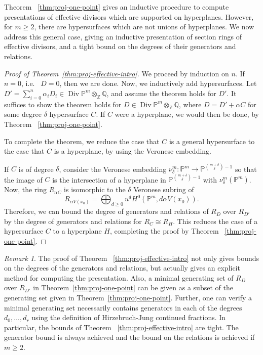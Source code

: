 \documentclass{amsart}
\theoremstyle{plain}
\theoremstyle{definition}
\theoremstyle{remark}
\newtheorem{rem}[thm]{Remark}
\numberwithin{equation}{section}
\newcommand\bq{{\mathbb Q}}
\newcommand\bp{{\mathbb P}}
\newcommand\bz{{\mathbb Z}}
\DeclareMathOperator\di{Div}
\newcommand\pdeg{\delta}
\begin{document}
Theorem ~\ref{thm:proj-one-point} gives an inductive procedure to
compute presentations of effective divisors which are supported on
hyperplanes. However, for $m \geq 2$, there are hypersurfaces which
are not unions of hyperplanes. We now address this general case, giving an inductive presentation of section rings of effective divisors, and a tight bound on the degrees of their generators and
relations.

\begin{proof}[Proof of Theorem~\ref{thm:proj-effective-intro}]
We proceed by induction on $n$.
If $n = 0$, i.e.~ $D = 0$, then we are done.
Now, we inductively add hypersurfaces.
Let $D' = \sum_{i = 0}^{n} \alpha_i D_i \in \di \bp^m \otimes_\bz \bq$, 
and assume the theorem holds for $D'$. It suffices to show
the theorem holds for $D \in \di \bp^m \otimes_\bz \bq$, where $D = D' + \alpha C$ for some
degree $\pdeg$ hypersurface $C$.
If $C$ were a hyperplane, we would then be done, by Theorem ~\ref{thm:proj-one-point}.

To complete the theorem, we reduce the case that $C$ is a general hypersurface
to the case that $C$ is a hyperplane, by using the Veronese embedding.

If $C$ is of degree $\pdeg$, consider the Veronese embedding
$\nu_\pdeg^m \colon \bp^m \rightarrow \bp^{\binom{m+\pdeg}{\pdeg}-1}$
so that the image of $C$ is the intersection of 
a hyperplane in $\bp^{\binom{{m + \pdeg}}{\pdeg} - 1}$ with $\nu_\pdeg^m(\bp^m)$.
Now, the ring $R_{\alpha C}$ is isomorphic to the
$\pdeg$ Veronese subring of 
\[R_{\alpha V(x_0)} = \bigoplus_{d \geq 0} u^d H^0(\bp^m, d \alpha V(x_0)).\]
Therefore, we can bound the degree of generators and relations of
$R_D$ over $R_{D'}$ by the degree of generators and
relations for $R_C \cong R_H.$
This reduces the case of a hypersurface $C$ to
a hyperplane $H$, completing the proof by Theorem
~\ref{thm:proj-one-point}.
\end{proof}

\begin{rem}
\label{rem:exact-effective-bounds}
The proof of Theorem ~\ref{thm:proj-effective-intro} not only gives bounds on the degrees of the generators and relations, but actually gives an explicit method for computing the presentation. 
Also, a minimal generating set of $R_D$ over $R_{D'}$ in 
Theorem~\ref{thm:proj-one-point}
can be given as a subset of the generating set given in 
Theorem~\ref{thm:proj-one-point}. Further,
one can verify a minimal generating
set necessarily contains generators in each of the degrees $d_0, \ldots, d_r$
using the definition of 
Hirzebruch-Jung continued fractions.
In particular,
the bounds of
Theorem ~\ref{thm:proj-effective-intro}
are tight. The generator bound is always achieved and the bound on the relations is achieved if $m \geq 2$.
\end{rem}
\end{document}
